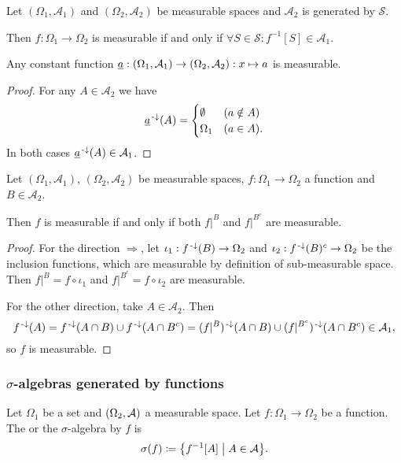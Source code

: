 \begin{lemma} \label{measurableFromGeneratingSet}
Let $(\Omega_1, \mathcal{A}_1)$ and $(\Omega_2, \mathcal{A}_2)$ be measurable spaces and $\mathcal{A}_2$ is generated by $\mathcal{S}$.

Then $f: \Omega_1\to \Omega_2$ is measurable \textup{if and only if} $\forall S\in\mathcal{S}: f^{-1}[S] \in \mathcal{A}_1$.
\end{lemma}

\begin{lemma} \label{constantFunctionsMeasurable}
Any constant function $\underline{a}: \left( \Omega_1,\mathcal{A}_1 \right) \to \left( \Omega_2,\mathcal{A}_2 \right): x\mapsto a$ is measurable.
\end{lemma}
\begin{proof}
For any $A\in\mathcal{A}_2$ we have
\[ \underline{a}^{{\text{\hspace{0.15em}-}\downarrow}}(A) = \begin{cases}
\emptyset & (a\notin A) \\
\Omega_1 & (a\in A).
\end{cases} \]
In both cases $\underline{a}^{{\text{\hspace{0.15em}-}\downarrow}}(A)\in\mathcal{A}_1$.
\end{proof}

\begin{lemma} \label{measurabilityCodomainPartition}
Let $(\Omega_1, \mathcal{A}_1)$, $(\Omega_2, \mathcal{A}_2)$ be measurable spaces, $f: \Omega_1 \to \Omega_2$ a function and $B\in \mathcal{A}_2$.

Then $f$ is measurable \textup{if and only if} both $f|^B$ and $f|^{B^c}$ are measurable.
\end{lemma}
\begin{proof}
For the direction $\Rightarrow$, let $\iota_1: f^{\text{\hspace{0.15em}-}\downarrow}(B)\to \Omega_2$ and $\iota_2: f^{\text{\hspace{0.15em}-}\downarrow}(B)^c\to \Omega_2$ be the inclusion functions, which are measurable by definition of sub-measurable space. Then $f|^B = f\circ \iota_1$ and $f|^{B^c} = f\circ \iota_2$ are measurable.

For the other direction, take $A\in \mathcal{A}_2$. Then
\[ f^{{\text{\hspace{0.15em}-}\downarrow}}(A) = f^{\text{\hspace{0.15em}-}\downarrow}(A\cap B) \cup f^{\text{\hspace{0.15em}-}\downarrow}(A\cap B^c) = (f|^B)^{\text{\hspace{0.15em}-}\downarrow}(A\cap B) \cup (f|^{B^c})^{\text{\hspace{0.15em}-}\downarrow}(A\cap B^c) \in \mathcal{A}_1, \]
so $f$ is measurable.
\end{proof}

\subsubsection{$\sigma$-algebras generated by functions}
\begin{definition}
Let $\Omega_1$ be a set and $\left( \Omega_2, \mathcal{A} \right)$ a measurable space. Let $f: \Omega_1\to \Omega_2$ be a function. The  or the $\sigma$-algebra  by $f$ is
\[ \sigma(f) \defeq \setbuilder{f^{-1}[A]}{A\in \mathcal{A}}. \]
\end{definition}

